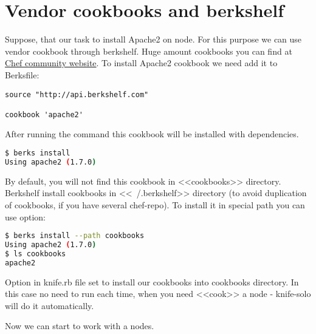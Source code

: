 \section{Vendor cookbooks and berkshelf}
\label{sec:solo-berkshelf}

Suppose, that our task to install Apache2 on node. For this purpose we can use vendor cookbook through berkshelf. Huge amount cookbooks you can find at \href{http://community.opscode.com/cookbooks}{Chef community website}. To install Apache2 cookbook we need add it to Berksfile:

\begin{lstlisting}[label=lst:my-cloud-berkshelf1,title=my-cloud/Berksfile]
source "http://api.berkshelf.com"

cookbook 'apache2'
\end{lstlisting}

After running the command  this cookbook will be installed with dependencies.

\begin{lstlisting}[language=Bash,label=lst:my-cloud-berkshelf2]
$ berks install
Using apache2 (1.7.0)
\end{lstlisting}

By default, you will not find this cookbook in <<cookbooks>> directory. Berkshelf install cookbooks in <<~/.berkshelf>> directory (to avoid duplication of cookbooks, if you have several chef-repo). To install it in special path you can use  option:

\begin{lstlisting}[language=Bash,label=lst:my-cloud-berkshelf3]
$ berks install --path cookbooks
Using apache2 (1.7.0)
$ ls cookbooks
apache2
\end{lstlisting}

Option  in knife.rb file set to install our cookbooks into cookbooks directory. In this case no need to run  each time, when you need <<cook>> a node - knife-solo will do it automatically.

Now we can start to work with a nodes.
